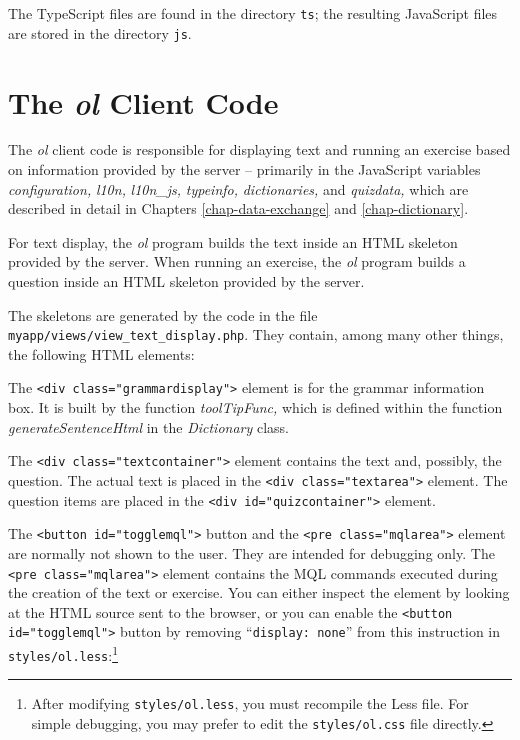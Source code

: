 \documentclass[11pt,oneside,a4paper]{memoir}
\newcommand*{\xml}[1]{\texttt{<#1>}}
\begin{document}
The TypeScript files are found in the directory \texttt{ts}; the resulting JavaScript files are
stored in the directory \texttt{js}.

\section{The \emph{ol} Client Code}\label{sec-ol}

The \emph{ol} client code is responsible for displaying text and running an exercise based on
information provided by the server -- primarily in the JavaScript variables \emph{configuration,}%
\emph{l10n,}%
\emph{l10n\_js,}%
\emph{typeinfo,}%
\emph{dictionaries,}%
and \emph{quizdata,}%
which are described in detail in Chapters \ref{chap-data-exchange} and \ref{chap-dictionary}.

For text display, the \emph{ol} program builds the text inside an HTML skeleton provided by the
server. When running an exercise, the \emph{ol} program builds a question inside an HTML skeleton provided by the
server.

The skeletons are generated by the code in the file \texttt{myapp/views/view\_text\_display.php}. They
contain, among many other things, the following HTML elements:

The \xml{div class="grammardisplay"} element is for the grammar information box.%
It is built by the function \emph{toolTipFunc,} which is defined within the function
\emph{generateSentenceHtml} in the \emph{Dictionary} class.

The \xml{div class="textcontainer"} element contains the text and, possibly, the question. The
actual text is placed in the \xml{div class="textarea"} element. The question items are placed
in the \xml{div id="quizcontainer"} element.

The \xml{button id="togglemql"} button and the \xml{pre class="mqlarea"} element are normally not
shown to the user. They are intended for debugging only. The \xml{pre class="mqlarea"} element
contains the MQL commands executed during the creation of the text
or exercise. You can either inspect the element by looking at the HTML source sent to the browser,
or you can enable the \xml{button id="togglemql"} button by removing ``\texttt{display:~none}'' from
this instruction in \texttt{styles/ol.less}:\footnote{After modifying \texttt{styles/ol.less}, you
  must recompile the Less file. For simple debugging, you may prefer to edit the
  \texttt{styles/ol.css} file directly.}
\end{document}
